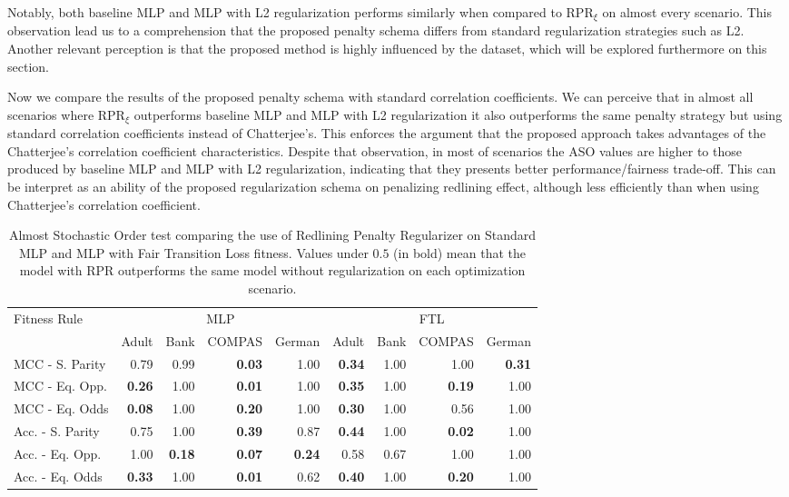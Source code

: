 Notably, both baseline MLP and MLP with L2 regularization performs similarly when compared to  RPR$_{\xi}$ on almost every scenario. This observation lead us to a comprehension that the proposed penalty schema differs from standard regularization strategies such as L2. Another relevant perception is that the proposed method is highly influenced by the dataset, which will be explored furthermore on this section.

Now we compare the results of the proposed penalty schema with standard correlation coefficients. We can perceive that in almost all scenarios where RPR$_{\xi}$ outperforms baseline MLP and MLP with L2 regularization it also outperforms the same penalty strategy but using  standard correlation coefficients instead of Chatterjee's. This enforces the argument that the proposed approach takes advantages of the Chatterjee's correlation coefficient characteristics. Despite that observation, in most of scenarios the ASO values are higher to those produced by baseline MLP and MLP with L2 regularization, indicating that they presents better performance/fairness trade-off. This can be interpret as an ability of the proposed regularization schema on penalizing redlining effect, although less efficiently than when using Chatterjee's correlation coefficient.

\begin{table}[ht]
\centering
\caption{Almost Stochastic Order test comparing the use of Redlining Penalty Regularizer on Standard MLP and MLP with Fair Transition Loss fitness. Values under $0.5$ (in bold) mean that the model with RPR outperforms the same model without regularization on each optimization scenario.} \label{tab:aso_compare_rpr}
{\footnotesize
\begin{tabular}{lrrrr|rrrr}
\toprule
\multirow{2}{*}{Fitness Rule} & \multicolumn{4}{c}{MLP} & \multicolumn{4}{c}{FTL} \\
& Adult & Bank & COMPAS & German & Adult & Bank & COMPAS & German \\
\midrule
MCC - S. Parity & 0.79 & 0.99 & \textbf{0.03} & 1.00 & \textbf{0.34} & 1.00 & 1.00 & \textbf{0.31} \\
MCC - Eq. Opp. & \textbf{0.26} & 1.00 & \textbf{0.01} & 1.00 & \textbf{0.35} & 1.00 & \textbf{0.19} & 1.00 \\
MCC - Eq. Odds & \textbf{0.08} & 1.00 & \textbf{0.20} & 1.00 & \textbf{0.30} & 1.00 & 0.56 & 1.00 \\
Acc. - S. Parity & 0.75 & 1.00 & \textbf{0.39} & 0.87 & \textbf{0.44} & 1.00 & \textbf{0.02} & 1.00 \\
Acc. - Eq. Opp. & 1.00 & \textbf{0.18} & \textbf{0.07} & \textbf{0.24} & 0.58 & 0.67 & 1.00 & 1.00 \\
Acc. - Eq. Odds & \textbf{0.33} & 1.00 & \textbf{0.01} & 0.62 & \textbf{0.40} & 1.00 & \textbf{0.20} & 1.00 \\
\bottomrule
\end{tabular}
}
\end{table}


